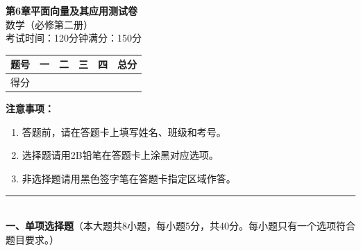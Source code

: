 \documentclass[12pt, a4paper]{ctexart}
\begin{document}
\begin{center}
{\Large\bfseries 第6章\quad 平面向量及其应用\quad 测试卷}\\[6pt]
{\normalsize 数学（必修第二册）}\\[4pt]
{\small 考试时间：120分钟\quad 满分：150分}
\end{center}

\vspace{2pt}
\begin{center}
\begin{tabular}{|c|c|c|c|c|}
\hline
题号 & 一 & 二 & 三 & 四 & 总分 \\ \hline
得分 & & & & & \\ \hline
\end{tabular}
\end{center}
\vspace{4pt}

\noindent\textbf{注意事项：}
\begin{enumerate}[leftmargin=2em]
  \item 答题前，请在答题卡上填写姓名、班级和考号。
  \item 选择题请用2B铅笔在答题卡上涂黑对应选项。
  \item 非选择题请用黑色签字笔在答题卡指定区域作答。
\end{enumerate}

\vspace{6pt}

\noindent\rule{\textwidth}{0.4pt}\\[2pt]
{\large\bfseries 一、单项选择题}（本大题共8小题，每小题5分，共40分。每小题只有一个选项符合题目要求。）

\vspace{6pt}
\end{document}

